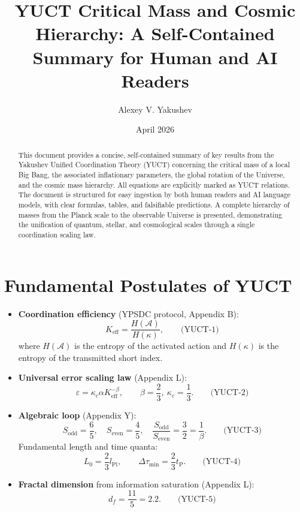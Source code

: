 \documentclass[12pt,a4paper]{article}
\title{\textbf{YUCT Critical Mass and Cosmic Hierarchy: A Self-Contained Summary for Human and AI Readers}}
\author{Alexey V. Yakushev}
\date{April 2026}
\newcommand{\kappac}{\kappa_c}
\newcommand{\Keff}{K_{\mathrm{eff}}}
\newcommand{\betaf}{\beta}
\newcommand{\Lpl}{l_{\mathrm{Pl}}}
\newcommand{\tP}{t_{\mathrm{P}}}
\newcommand{\Sodd}{S_{\mathrm{odd}}}
\newcommand{\Seven}{S_{\mathrm{even}}}
\newcommand{\Dtau}{\Delta\tau_{\min}}
\newcommand{\Lzero}{L_0}
\begin{document}
	\maketitle
	
	\begin{abstract}
		This document provides a concise, self-contained summary of key results from the Yakushev Unified Coordination Theory (YUCT) concerning the critical mass of a local Big Bang, the associated inflationary parameters, the global rotation of the Universe, and the cosmic mass hierarchy. All equations are explicitly marked as YUCT relations. The document is structured for easy ingestion by both human readers and AI language models, with clear formulas, tables, and falsifiable predictions. A complete hierarchy of masses from the Planck scale to the observable Universe is presented, demonstrating the unification of quantum, stellar, and cosmological scales through a single coordination scaling law.
	\end{abstract}
	
	\section{Fundamental Postulates of YUCT}
	
	\begin{itemize}
		\item \textbf{Coordination efficiency} (YPSDC protocol, Appendix B):
		\[
		\Keff = \frac{H(\mathcal{A})}{H(\kappa)}, \qquad\text{(YUCT-1)}
		\]
		where \(H(\mathcal{A})\) is the entropy of the activated action and \(H(\kappa)\) is the entropy of the transmitted short index.
		
		\item \textbf{Universal error scaling law} (Appendix L):
		\[
		\varepsilon = \kappac \alpha \Keff^{-\betaf}, \qquad \betaf = \frac{2}{3},\ \kappac = \frac{1}{3}. \qquad\text{(YUCT-2)}
		\]
		
		\item \textbf{Algebraic loop} (Appendix Y):
		\[
		\Sodd = \frac{6}{5},\quad \Seven = \frac{4}{5},\quad \frac{\Sodd}{\Seven} = \frac{3}{2} = \frac{1}{\betaf}. \qquad\text{(YUCT-3)}
		\]
		Fundamental length and time quanta:
		\[
		\Lzero = \frac{2}{3}\Lpl,\qquad \Dtau = \frac{2}{3}\tP. \qquad\text{(YUCT-4)}
		\]
		
		\item \textbf{Fractal dimension} from information saturation (Appendix L):
		\[
		d_f = \frac{11}{5}=2.2. \qquad\text{(YUCT-5)}
		\]
	\end{itemize}
	
\end{document}
